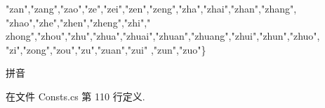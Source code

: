 \begin{DoxyCode}
{      "zan"},\textcolor{stringliteral}{"zang"},\textcolor{stringliteral}{"zao"},\textcolor{stringliteral}{"ze"},\textcolor{stringliteral}{"zei"},\textcolor{stringliteral}{"zen"},\textcolor{stringliteral}{"zeng"},\textcolor{stringliteral}{"zha"},\textcolor{stringliteral}{"zhai"},\textcolor{stringliteral}{"zhan"},\textcolor{stringliteral}{"zhang"},
                                                                        \textcolor{stringliteral}{"zhao"},\textcolor{stringliteral}{"zhe"},\textcolor{stringliteral}{"zhen"},\textcolor{stringliteral}{"zheng"},\textcolor{stringliteral}{"zhi"},\textcolor{stringliteral}{"
      zhong"},\textcolor{stringliteral}{"zhou"},\textcolor{stringliteral}{"zhu"},\textcolor{stringliteral}{"zhua"},\textcolor{stringliteral}{"zhuai"},\textcolor{stringliteral}{"zhuan"},\textcolor{stringliteral}{"zhuang"},\textcolor{stringliteral}{"zhui"},\textcolor{stringliteral}{"zhun"},\textcolor{stringliteral}{"zhuo"},
                                                                        \textcolor{stringliteral}{"zi"},\textcolor{stringliteral}{"zong"},\textcolor{stringliteral}{"zou"},\textcolor{stringliteral}{"zu"},\textcolor{stringliteral}{"zuan"},\textcolor{stringliteral}{"zui"}
      ,\textcolor{stringliteral}{"zun"},\textcolor{stringliteral}{"zuo"}\}
\end{DoxyCode}


拼音 



在文件 Consts.\-cs 第 110 行定义.

